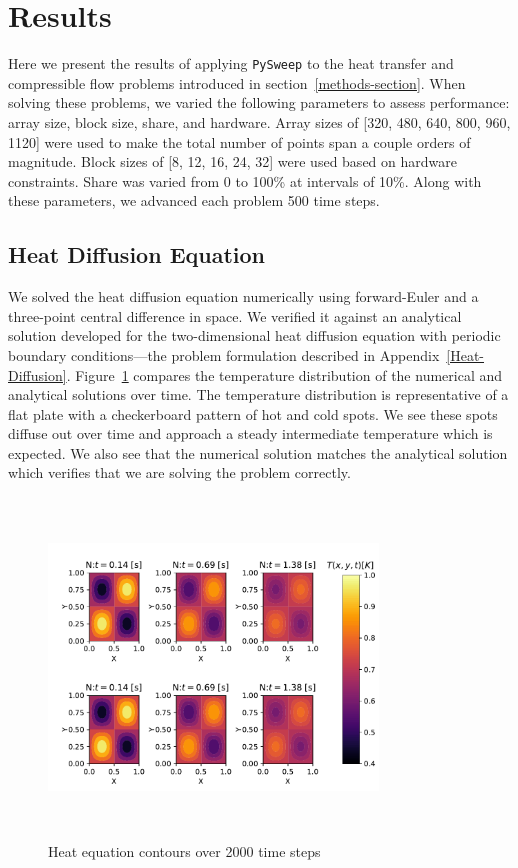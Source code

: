 \documentclass[preprints,article,accept,moreauthors,pdftex]{Definitions/mdpi}
\def\pysweep{\texttt{PySweep}}
\begin{document}
\section{Results}
\label{results-section}

Here we present the results of applying \pysweep{} to the heat transfer and compressible flow problems introduced in section~\ref{methods-section}. When solving these problems, we varied the following parameters to assess performance: array size, block size, share, and hardware. Array sizes of [320, 480, 640, 800, 960, 1120] were used to make the total number of points span a couple orders of magnitude. Block sizes of [8, 12, 16, 24, 32] were used based on hardware constraints. Share was varied from 0 to 100\% at intervals of 10\%. Along with these parameters, we advanced each problem 500 time steps.

\subsection{Heat Diffusion Equation}
\label{hdeResults}
We solved the heat diffusion equation numerically using forward-Euler and a three-point central difference in space. We verified it against an analytical solution developed for the two-dimensional heat diffusion equation with periodic boundary conditions---the problem formulation described in Appendix~\ref{Heat-Diffusion}. Figure~\ref{fig:heatSurface} compares the temperature distribution of the numerical and analytical solutions over time. The temperature distribution is representative of a flat plate with a checkerboard pattern of hot and cold spots. We see these spots diffuse out over time and approach a steady intermediate temperature which is expected. We also see that the numerical solution matches the analytical solution which verifies that we are solving the problem correctly.

\begin{figure}[H]
    \begin{center}
        \includegraphics[height=9cm,width=0.78\textwidth, trim={0.9cm 0.3cm 0.1cm 0.9cm},clip]{figs/heatValidate.pdf}
    \end{center}
    \caption{Heat equation contours over 2000 time steps}
    \label{fig:heatSurface}
\end{figure}
\end{document}
